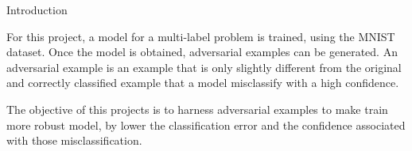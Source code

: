 \begin{frame}{Introduction}

For this project, a model for a multi-label problem is trained, using the MNIST dataset. Once the model is obtained, adversarial examples can be generated. An adversarial example is an example that is only slightly different from the original and correctly classified example that a model misclassify with a high confidence.

\vspace{0.1in}

The objective of this projects is to harness adversarial examples to make train more robust model, by lower the classification error and the confidence associated with those misclassification.

\end{frame}

